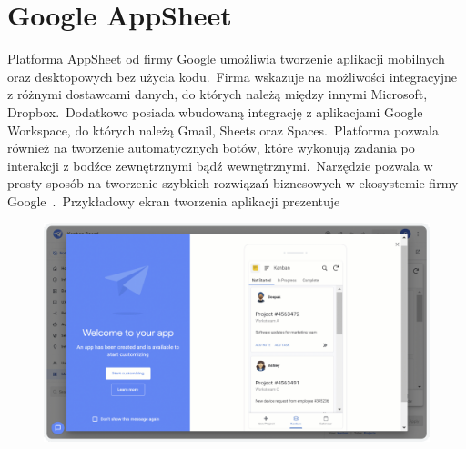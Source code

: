 \section{Google AppSheet}
Platforma AppSheet od firmy Google umożliwia tworzenie aplikacji mobilnych oraz desktopowych bez użycia kodu.\ Firma wskazuje na możliwości integracyjne z różnymi dostawcami danych, do których należą między innymi Microsoft, Dropbox.\ Dodatkowo posiada wbudowaną integrację z aplikacjami Google Workspace, do których należą Gmail, Sheets oraz Spaces.\ Platforma pozwala również na tworzenie automatycznych botów, które wykonują zadania po interakcji z bodźce zewnętrznymi bądź wewnętrznymi.\ Narzędzie pozwala w prosty sposób na tworzenie szybkich rozwiązań biznesowych w ekosystemie firmy Google~\cite{GoogleAppSheet}.\ Przykładowy ekran tworzenia aplikacji prezentuje 
\begin{figure}[H]
    \centering
    \includegraphics[width=\textwidth]{images/google_as}
    \label{fig:ga-as}
\end{figure}
